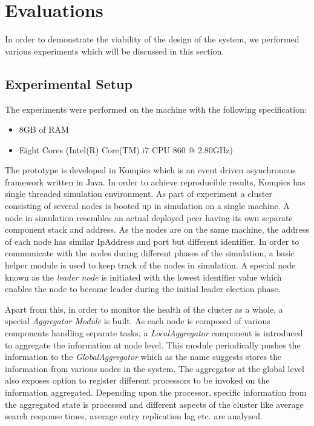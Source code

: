 \documentclass[a4paper,11pt]{kth-mag}
\begin{document}
\chapter{Evaluations}
\label{chap:eval}

In order to demonstrate the viability of the design of the system, we performed various experiments which will be discussed in this section.


\section{Experimental Setup}

The experiments were performed on the machine with the following specification:

\begin{itemize}
\item 8GB of RAM
\item Eight Cores (Intel(R) Core(TM) i7 CPU 860  @ 2.80GHz)
\end{itemize}

The prototype is developed in Kompics which is an event driven asynchronous framework written in Java. In order to achieve reproducible results, Kompics has single threaded simulation environment. As part of experiment a cluster consisting of several nodes is booted up in simulation on a single machine. A node in simulation resembles an actual deployed peer having its own separate component stack and address. As the nodes are on the same machine, the address of each node has similar IpAddress and port but different identifier. In order to communicate with the nodes during different phases of the simulation, a basic helper module is used to keep track of the nodes in simulation. A special node known as the \textit{leader node} is initiated with the lowest identifier value which enables the node to become leader during the initial leader election phase.

\par Apart from this, in order to monitor the health of the cluster as a whole, a special \textit{Aggregator Module} is built. As each node is composed of various components handling separate tasks, a \textit{LocalAggregator} component is introduced to aggregate the information at node level. This module periodically pushes the information to the \textit{GlobalAggregator} which as the name suggests stores the information from various nodes in the system. The aggregator at the global level also exposes option to register different processors to be invoked on the information aggregated. Depending upon the processor, specific information from the aggregated state is processed and different aspects of the cluster like average search response times, average entry replication lag etc. are analyzed.  
\end{document}
